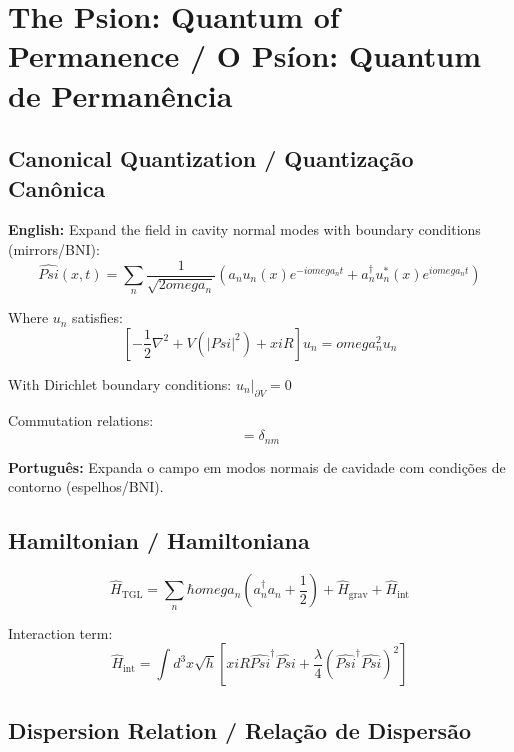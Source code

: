\documentclass[12pt,a4paper]{article}
\def\Psi{Psi}%
\def\xi{xi}%
\def\omega{omega}%
\begin{document}
\section{The Psion: Quantum of Permanence / O Psíon: Quantum de Permanência}

\subsection{Canonical Quantization / Quantização Canônica}

\textbf{English:} Expand the field in cavity normal modes with boundary conditions (mirrors/BNI):
\begin{equation}
\hat{\Psi}(x,t) = \sum_n \frac{1}{\sqrt{2\omega_n}}\left(a_n u_n(x)e^{-i\omega_n t} + a_n^\dagger u_n^*(x)e^{i\omega_n t}\right)
\end{equation}

Where $u_n$ satisfies:
\begin{equation}
\left[-\frac{1}{2}\nabla^2 + V(|\Psi|^2) + \xi R\right]u_n = \omega_n^2 u_n
\end{equation}

With Dirichlet boundary conditions: $u_n|_{\partial V} = 0$

Commutation relations:
\begin{equation}
[a_n, a_m^\dagger] = \delta_{nm}
\end{equation}

\textbf{Português:} Expanda o campo em modos normais de cavidade com condições de contorno (espelhos/BNI).

\subsection{Hamiltonian / Hamiltoniana}

\begin{equation}
\hat{H}_{\text{TGL}} = \sum_n \hbar\omega_n\left(a_n^\dagger a_n + \frac{1}{2}\right) + \hat{H}_{\text{grav}} + \hat{H}_{\text{int}}
\end{equation}

Interaction term:
\begin{equation}
\hat{H}_{\text{int}} = \int d^3x\sqrt{h}\left[\xi R\hat{\Psi}^\dagger\hat{\Psi} + \frac{\lambda}{4}(\hat{\Psi}^\dagger\hat{\Psi})^2\right]
\end{equation}

\subsection{Dispersion Relation / Relação de Dispersão}
\end{document}
